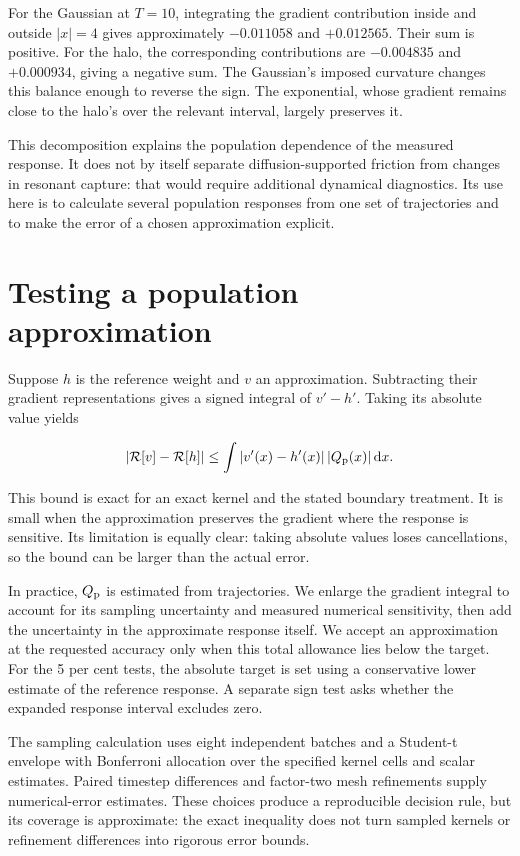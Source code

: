 \documentclass[fleqn,usenatbib]{mnras}
\begin{document}
For the Gaussian at \(T=10\), integrating the gradient contribution inside and outside \(|x|=4\) gives approximately \(-0.011058\) and \(+0.012565\). Their sum is positive. For the halo, the corresponding contributions are \(-0.004835\) and \(+0.000934\), giving a negative sum. The Gaussian's imposed curvature changes this balance enough to reverse the sign. The exponential, whose gradient remains close to the halo's over the relevant interval, largely preserves it.

This decomposition explains the population dependence of the measured response. It does not by itself separate diffusion-supported friction from changes in resonant capture: that would require additional dynamical diagnostics. Its use here is to calculate several population responses from one set of trajectories and to make the error of a chosen approximation explicit.

\section{Testing a population approximation}\label{accuracy}

Suppose \(h\) is the reference weight and \(v\) an approximation. Subtracting their gradient representations gives a signed integral of \(v'-h'\). Taking its absolute value yields

\begin{equation}\label{EQ-ERR-01}
\left|\mathcal R[v]-\mathcal R[h]\right|
\leq \int |v'(x)-h'(x)|\,|Q_{\rm p}(x)|\,\mathrm dx.
\end{equation}

This bound is exact for an exact kernel and the stated boundary treatment. It is small when the approximation preserves the gradient where the response is sensitive. Its limitation is equally clear: taking absolute values loses cancellations, so the bound can be larger than the actual error.

In practice, \(Q_{\rm p}\) is estimated from trajectories. We enlarge the gradient integral to account for its sampling uncertainty and measured numerical sensitivity, then add the uncertainty in the approximate response itself. We accept an approximation at the requested accuracy only when this total allowance lies below the target. For the 5 per cent tests, the absolute target is set using a conservative lower estimate of the reference response. A separate sign test asks whether the expanded response interval excludes zero.

The sampling calculation uses eight independent batches and a Student-t envelope with Bonferroni allocation over the specified kernel cells and scalar estimates. Paired timestep differences and factor-two mesh refinements supply numerical-error estimates. These choices produce a reproducible decision rule, but its coverage is approximate: the exact inequality does not turn sampled kernels or refinement differences into rigorous error bounds.
\end{document}
